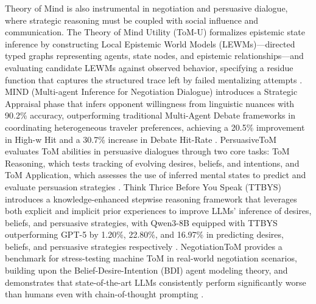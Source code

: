 \documentclass[11pt]{article}
\begin{document}
Theory of Mind is also instrumental in negotiation and persuasive dialogue, where strategic reasoning must be coupled with social influence and communication. The Theory of Mind Utility (ToM-U) formalizes epistemic state inference by constructing Local Epistemic World Models (LEWMs)---directed typed graphs representing agents, state nodes, and epistemic relationships---and evaluating candidate LEWMs against observed behavior, specifying a residue function that captures the structured trace left by failed mentalizing attempts \cite{ref237}. MIND (Multi-agent Inference for Negotiation Dialogue) introduces a Strategic Appraisal phase that infers opponent willingness from linguistic nuances with 90.2\% accuracy, outperforming traditional Multi-Agent Debate frameworks in coordinating heterogeneous traveler preferences, achieving a 20.5\% improvement in High-w Hit and a 30.7\% increase in Debate Hit-Rate \cite{ref238}. PersuasiveToM evaluates ToM abilities in persuasive dialogues through two core tasks: ToM Reasoning, which tests tracking of evolving desires, beliefs, and intentions, and ToM Application, which assesses the use of inferred mental states to predict and evaluate persuasion strategies \cite{ref239}. Think Thrice Before You Speak (TTBYS) introduces a knowledge-enhanced stepwise reasoning framework that leverages both explicit and implicit prior experiences to improve LLMs' inference of desires, beliefs, and persuasive strategies, with Qwen3-8B equipped with TTBYS outperforming GPT-5 by 1.20\%, 22.80\%, and 16.97\% in predicting desires, beliefs, and persuasive strategies respectively \cite{ref240}. NegotiationToM provides a benchmark for stress-testing machine ToM in real-world negotiation scenarios, building upon the Belief-Desire-Intention (BDI) agent modeling theory, and demonstrates that state-of-the-art LLMs consistently perform significantly worse than humans even with chain-of-thought prompting \cite{ref241}.
\end{document}
